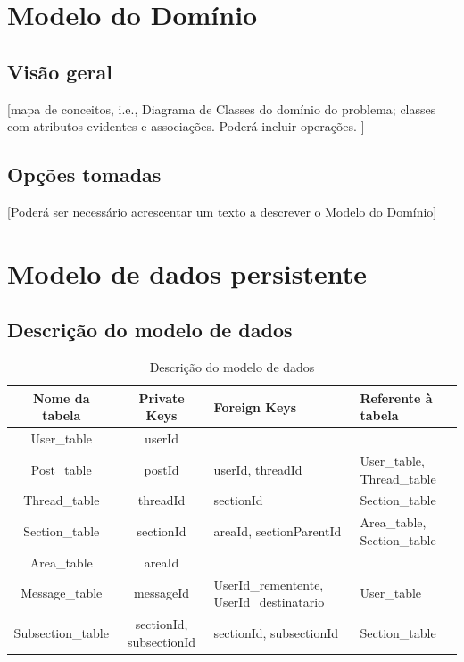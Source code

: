 \documentclass[a4paper]{article}
\begin{document}
	

	
	\newpage
		
		
		
		\section{Modelo do Domínio}
		\subsection{Visão geral}
		
		[mapa de conceitos, i.e., Diagrama de Classes do domínio do problema; classes com atributos  evidentes e associações. Poderá incluir operações. ] 
		
		\subsection{Opções tomadas}
		[Poderá ser necessário acrescentar um texto a descrever o Modelo do Domínio] 

		
		
		
		
		\newpage
		
		\section{Modelo de dados persistente}

			
		
		
		\subsection{Descrição do modelo de dados}
		
		\begin{table}[h]
		\begin{tabular}{|c|c|p{4cm}|p{4cm}|}
			\hline Nome da tabela & Private Keys & Foreign Keys & Referente à tabela \\ 
			\hline User\_table & userId &  &  \\ 
			\hline Post\_table & postId & userId, threadId & User\_table, Thread\_table  \\ 
			\hline Thread\_table & threadId & sectionId & Section\_table \\ 
			\hline Section\_table & sectionId & areaId, sectionParentId & Area\_table, Section\_table \\ 
			\hline Area\_table & areaId &  &  \\ 
			\hline Message\_table & messageId & UserId\_rementente, UserId\_destinatario & User\_table \\ 
			\hline Subsection\_table & sectionId, subsectionId & sectionId, subsectionId & Section\_table \\
			\hline 
		\end{tabular} 
		\caption{Descrição do modelo de dados}
		\end{table}
		
\end{document}
